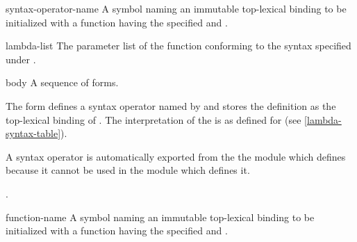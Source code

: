 \begin{optDefinition}
%
\Syntax
{}%
%
\begin{arguments}
    \item[syntax-operator-name] A symbol naming an immutable top-lexical binding
    to be initialized with a function having the specified 
    and .

    \item[lambda-list] The parameter list of the function conforming to the
    syntax specified under .

    \item[body] A sequence of forms.
\end{arguments}
%
\remarks%
The  form defines a syntax operator  named by  and stores the definition as
the top-lexical binding of 
.  The interpretation of the 
is as defined for  (see \ref{lambda-syntax-table}).
%
\begin{note}
    A syntax operator is automatically exported from the the module which
    defines because it cannot be used in the module which defines it.
\end{note}
%
\seealso%
.

%
\Syntax
{}%
%
\begin{arguments}
    \item[function-name] A symbol naming an immutable top-lexical binding to be
    initialized with a function having the specified  and
    .


\end{arguments}
\end{optDefinition}
